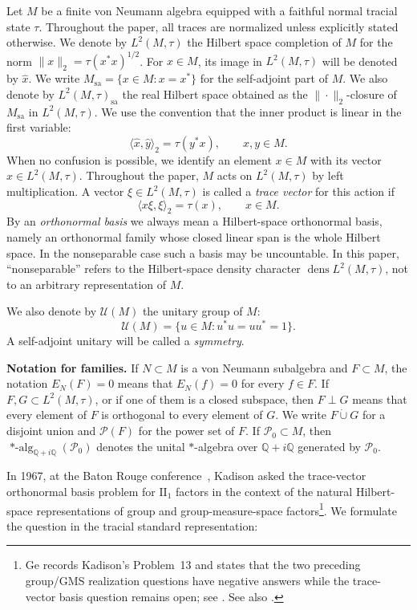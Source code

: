 \documentclass[11pt,letterpaper,reqno]{amsart}
\theoremstyle{definition}
\numberwithin{equation}{section}
\DeclareMathOperator{\dens}{dens}
\begin{document}
Let \(M\) be a finite von Neumann algebra equipped with a faithful normal
tracial state \(\tau\).  Throughout the paper, all traces are normalized
unless explicitly stated otherwise.  We denote by \(L^2(M,\tau)\) the Hilbert
space completion of \(M\) for the norm \(\|x\|_2=\tau(x^*x)^{1/2}\). For
\(x\in M\), its image in \(L^2(M,\tau)\) will be denoted by \(\widehat{x}\). We write
$
   M_{\mathrm{sa}}=\{x\in M:x=x^*\}
$
for the self-adjoint part of \(M\).  We also denote by
\(L^2(M,\tau)_{\mathrm{sa}}\) the real Hilbert space obtained as the
\(\|\cdot\|_2\)-closure of \(M_{\mathrm{sa}}\) in \(L^2(M,\tau)\). 
We use the convention that the inner product is linear in the first variable:
\[
   \langle \widehat{x},\widehat{y}\rangle_2=\tau(y^*x),
   \qquad x,y\in M.
\]
When no confusion is possible, we identify an element \(x\in M\) with its
vector \(\widehat x\in L^2(M,\tau)\).  Throughout the paper, \(M\) acts on
\(L^2(M,\tau)\) by left multiplication.  A vector
\(\xi\in L^2(M,\tau)\) is called a \emph{trace vector} for this action if
\[
   \langle x\xi,\xi\rangle_2=\tau(x),\qquad x\in M.
\]
By an \emph{orthonormal basis} we always mean a Hilbert-space orthonormal
basis, namely an orthonormal family whose closed linear span is the whole
Hilbert space.  In the nonseparable case such a basis may be uncountable.
In this paper, ``nonseparable'' refers to the Hilbert-space density character
\(\dens L^2(M,\tau)\), not to an arbitrary representation of \(M\).

We also denote by \(\mathcal U(M)\) the unitary group of \(M\):
\[
   \mathcal U(M)=\{u\in M:u^*u=uu^*=1\}.
\]
A self-adjoint unitary will be called a \emph{symmetry}.




\medskip
\noindent\textbf{Notation for families.}
If \(N\subset M\) is a von Neumann subalgebra and \(F\subset M\), the notation
\(E_N(F)=0\) means that \(E_N(f)=0\) for every \(f\in F\).  If
\(F,G\subset L^2(M,\tau)\), or if one of them is a closed subspace, then
\(F\perp G\) means that every element of \(F\) is orthogonal to every element
of \(G\).  We write \(F\dot\cup G\) for a disjoint union and \(\mathcal P(F)\)
for the power set of \(F\).  If \(\mathcal P_0\subset M\), then
\(\operatorname{*-alg}_{\mathbb Q+i\mathbb Q}(\mathcal P_0)\) denotes the
unital \(*\)-algebra over \(\mathbb Q+i\mathbb Q\) generated by
\(\mathcal P_0\).







In 1967, at the Baton Rouge conference~\cite{Kad67}, Kadison asked the
trace-vector orthonormal basis problem for \(\mathrm{II}_1\) factors in the
context of the natural Hilbert-space representations of group and
group-measure-space factors\footnote{Ge records Kadison's Problem~13 and
states that the two preceding group/GMS realization questions have negative
answers while the trace-vector basis question remains open; see
\cite[p.~622, Problem~13]{Ge03}.  See also \cite[Problem~S.2]{Pet20}.}.
We formulate the question in the tracial standard representation:
\end{document}
